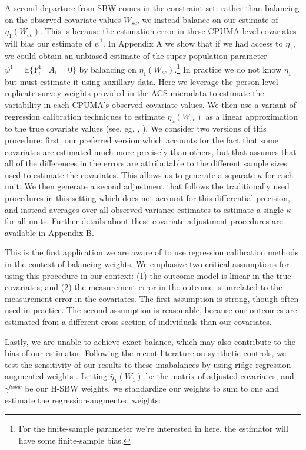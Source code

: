 \documentclass{article}
\begin{document}
A second departure from SBW comes in the constraint set: rather than balancing on the observed covariate values $W_{sc}$, we instead balance on our estimate of $\eta_1(W_{sc})$. This is because the estimation error in these CPUMA-level covariates will bias our estimate of $\psi^1$. In Appendix A we show that if we had access to $\eta_1$, we could obtain an unbiased estimate of the super-population parameter $\psi^1 = \mathbb{E}\{Y_i^1 \mid A_i = 0\}$ by balancing on $\eta_1(W_{sc})$.\footnote{For the finite-sample parameter we're interested in here, the estimator will have some finite-sample bias.} In practice we do not know $\eta_1$ but must estimate it using auxillary data. Here we leverage the person-level replicate survey weights provided in the ACS microdata to estimate the variability in each CPUMA's observed covariate values. We then use a variant of regression calibration techniques to estimate $\eta_a(W_{sc})$ as a linear approximation to the true covariate values (see, eg, \cite{gleser1992importance}, \cite{carroll2006measurement}). We consider two versions of this procedure: first, our preferred version which accounts for the fact that some covariates are estimated much more precisely than others, but that assumes that all of the differences in the errors are attributable to the different sample sizes used to estimate the covariates. This allows us to generate a separate $\kappa$ for each unit. We then generate a second adjustment that follows the traditionally used procedures in this setting which does not account for this differential precision, and instead averages over all observed variance estimates to estimate a single $\kappa$ for all units. Further details about these covariate adjustment procedures are available in Appendix B.

This is the first application we are aware of to use regression calibration methods in the context of balancing weights. We emphasize two critical assumptions for using this procedure in our context: (1) the outcome model is linear in the true covariates; and (2) the measurement error in the outcome is unrelated to the measurement error in the covariates. The first assumption is strong, though often used in practice. The second assumption is reasonable, because our outcomes are estimated from a different cross-section of individuals than our covariates. 

Lastly, we are unable to achieve exact balance, which may also contribute to the bias of our estimator. Following the recent literature on synthetic controls, we test the sensitivity of our results to these imabalances by using ridge-regression augmented weights \cite{ben2018augmented}. Letting $\hat{\eta}_1(W_1)$ be the matrix of adjusted covariates, and $\gamma^{hsbw}$ be our H-SBW weights, we standardize our weights to sum to one and estimate the regression-augmented weights:
\end{document}
